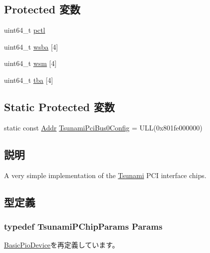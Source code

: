 \subsection*{Protected 変数}
\begin{DoxyCompactItemize}
\item 
uint64\_\-t \hyperlink{classTsunamiPChip_a8df2c098b72e9eee77a79290c8e4a6c5}{pctl}
\item 
uint64\_\-t \hyperlink{classTsunamiPChip_a8281ba8e4694bf75ec8b8b5d4d4ad50f}{wsba} \mbox{[}4\mbox{]}
\item 
uint64\_\-t \hyperlink{classTsunamiPChip_a16d1e04d18db960e6c8059d404989395}{wsm} \mbox{[}4\mbox{]}
\item 
uint64\_\-t \hyperlink{classTsunamiPChip_ad35698b8e7094fe0888d00cad38965ec}{tba} \mbox{[}4\mbox{]}
\end{DoxyCompactItemize}
\subsection*{Static Protected 変数}
\begin{DoxyCompactItemize}
\item 
static const \hyperlink{base_2types_8hh_af1bb03d6a4ee096394a6749f0a169232}{Addr} \hyperlink{classTsunamiPChip_a8a9c49447e0f2ce2f8aaf2c7a4299eac}{TsunamiPciBus0Config} = ULL(0x801fe000000)
\end{DoxyCompactItemize}


\subsection{説明}
A very simple implementation of the \hyperlink{classTsunami}{Tsunami} PCI interface chips. 

\subsection{型定義}
\hypertarget{classTsunamiPChip_ad83d95a5c11dc8215f058bbac3c02dd6}{
\subsubsection[{Params}]{\setlength{\rightskip}{0pt plus 5cm}typedef TsunamiPChipParams {\bf Params}}}
\label{classTsunamiPChip_ad83d95a5c11dc8215f058bbac3c02dd6}


\hyperlink{classBasicPioDevice_a2845515ac6467f10540747053c8a0449}{BasicPioDevice}を再定義しています。

